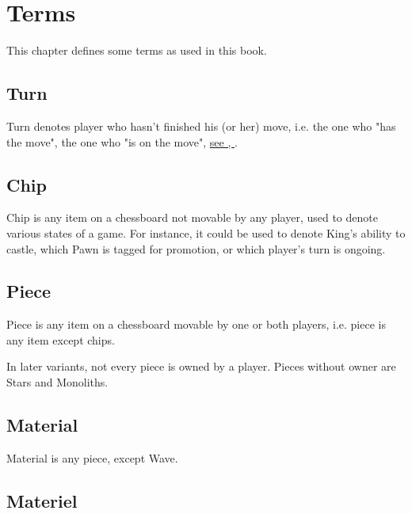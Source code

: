 

\chapter*{Terms}
\label{ch:Terms}

This chapter defines some terms as used in this book.

\section*{Turn}
\label{sec:Terms/Turn}
Turn denotes player who hasn't finished his (or her) move, i.e. the one who
"has the move", the one who "is on the move",
\hyperlink{sec:Prerequisites/FIDE point}{see , }.

\section*{Chip}
\label{sec:Terms/Chip}
Chip is any item on a chessboard not movable by any player, used to denote
various states of a game. For instance, it could be used to denote King's
ability to castle, which Pawn is tagged for promotion, or which player's
turn is ongoing.

\section*{Piece}
\label{sec:Terms/Piece}
Piece is any item on a chessboard movable by one or both players, i.e. piece
is any item except chips.

In later variants, not every piece is owned by a player. Pieces without owner
are Stars and Monoliths.

\section*{Material}
\label{sec:Terms/Material}

Material is any piece, except Wave.

\section*{Materiel}
\label{sec:Terms/Materiel}

